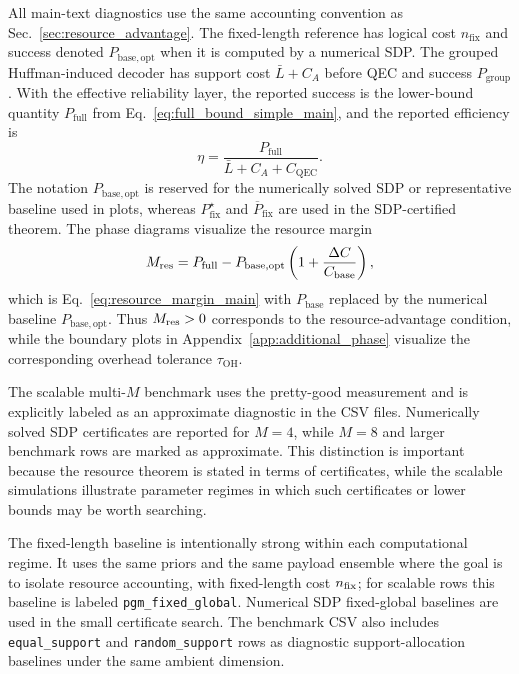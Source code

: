 \documentclass[
 reprint,
 amsmath,amssymb,
 aps,
 pra,
 floatfix,
]{revtex4-2}
\begin{document}
All main-text diagnostics use the same accounting convention as Sec.~\ref{sec:resource_advantage}. The fixed-length reference has logical cost \(n_{\mathrm{fix}}\) and success denoted \(P_{\mathrm{base,opt}}\) when it is computed by a numerical SDP. The grouped Huffman-induced decoder has support cost \(\bar L+C_A\) before QEC and success \(P_{\mathrm{group}}\). With the effective reliability layer, the reported success is the lower-bound quantity \(P_{\mathrm{full}}\) from Eq.~\eqref{eq:full_bound_simple_main}, and the reported efficiency is
\begin{equation}
    \eta=\frac{P_{\mathrm{full}}}{\bar L+C_A+C_{\mathrm{QEC}}}.
\end{equation}
The notation \(P_{\mathrm{base,opt}}\) is reserved for the numerically solved SDP or representative baseline used in plots, whereas \(P^\star_{\mathrm{fix}}\) and \(\overline P_{\mathrm{fix}}\) are used in the SDP-certified theorem.
The phase diagrams visualize the resource margin
\begin{equation}
    M_{\rm res}
    =
    P_{\mathrm{full}}
    -
    P_{\mathrm{base,opt}}
    \left(1+\frac{\Delta C}{C_{\mathrm{base}}}\right),
    \label{eq:numerical_margin}
\end{equation}
which is Eq.~\eqref{eq:resource_margin_main} with \(P_{\mathrm{base}}\) replaced by the numerical baseline \(P_{\mathrm{base,opt}}\). Thus \(M_{\rm res}>0\) corresponds to the resource-advantage condition, while the boundary plots in Appendix~\ref{app:additional_phase} visualize the corresponding overhead tolerance \(\tau_{\mathrm{OH}}\).

The scalable multi-\(M\) benchmark uses the pretty-good measurement and is explicitly labeled as an approximate diagnostic in the CSV files. Numerically solved SDP certificates are reported for \(M=4\), while \(M=8\) and larger benchmark rows are marked as approximate. This distinction is important because the resource theorem is stated in terms of certificates, while the scalable simulations illustrate parameter regimes in which such certificates or lower bounds may be worth searching.

The fixed-length baseline is intentionally strong within each computational regime. It uses the same priors and the same payload ensemble where the goal is to isolate resource accounting, with fixed-length cost \(n_{\rm fix}\); for scalable rows this baseline is labeled \texttt{pgm\_fixed\_global}. Numerical SDP fixed-global baselines are used in the small certificate search. The benchmark CSV also includes \texttt{equal\_support} and \texttt{random\_support} rows as diagnostic support-allocation baselines under the same ambient dimension.
\end{document}
